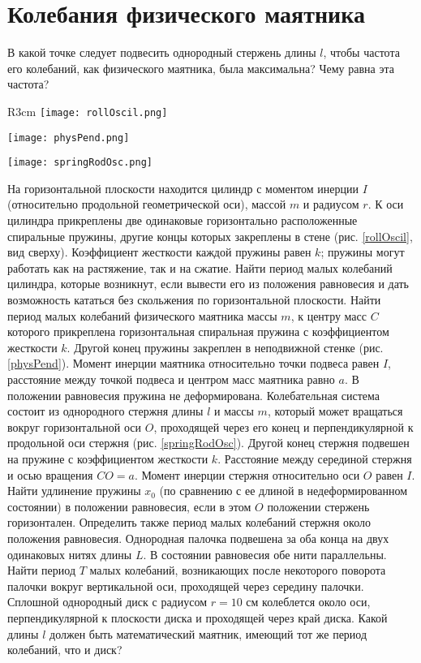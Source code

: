 \section{Колебания физического маятника}
\AddProb В какой точке следует подвесить однородный стержень длины  $l$, чтобы частота его колебаний, как физического маятника, была максимальна? Чему равна эта частота?

\begin{wrapfigure}[31]{R}{3cm}
\texttt{[image: rollOscil.png]}
\caption{}
\label{rollOscil}
\vspace{0.2cm}
\texttt{[image: physPend.png]}
\caption{}
\label{physPend}
\vspace{0.2cm}
\texttt{[image: springRodOsc.png]}
\caption{}
\label{springRodOsc}
\end{wrapfigure}
\AddProb На горизонтальной плоскости находится цилиндр с моментом инерции $I$ (относительно продольной геометрической оси), массой $m$ и радиусом $r$. К оси цилиндра прикреплены две одинаковые горизонтально расположенные спиральные пружины, другие концы которых закреплены в стене (рис. \ref{rollOscil}, вид сверху). 
Коэффициент жесткости каждой пружины равен $k$; пружины могут работать как на растяжение, так и на сжатие. Найти период малых колебаний цилиндра, которые возникнут, если вывести его из положения равновесия и дать возможность кататься без скольжения по горизонтальной плоскости.
\AddProb Найти период малых колебаний физического маятника массы $m$, к центру масс $C$ которого прикреплена горизонтальная спиральная пружина с коэффициентом жесткости $k$. Другой конец пружины закреплен в неподвижной стенке (рис. \ref{physPend}). Момент инерции маятника относительно точки подвеса равен $I$, расстояние между точкой подвеса и центром масс маятника равно $a$. В положении равновесия пружина не деформирована.
\AddProb Колебательная система состоит из однородного стержня длины $l$ и массы $m$, который может вращаться вокруг горизонтальной оси $O$, проходящей через его конец и перпендикулярной к продольной оси стержня (рис. \ref{springRodOsc}). Другой конец стержня подвешен на пружине с коэффициентом жесткости $k$. Расстояние между серединой стержня и осью вращения $CO = a$. Момент инерции стержня относительно оси $O$ равен $I$. Найти удлинение пружины $x_0$ (по сравнению с ее длиной в недеформированном состоянии) в положении равновесия, если в этом $O$ положении стержень горизонтален. Определить также период малых колебаний стержня около положения равновесия.
\AddProb Однородная палочка подвешена за оба конца на двух одинаковых нитях длины $L$. В состоянии равновесия обе нити параллельны. Найти период $T$ малых колебаний, возникающих после некоторого поворота палочки вокруг вертикальной оси, проходящей через середину палочки.
\AddProb Сплошной однородный диск с радиусом $r = 10$ см колеблется около оси, перпендикулярной к плоскости диска и проходящей через край диска. Какой длины $l$ должен быть математический маятник, имеющий тот же период колебаний, что и диск?

